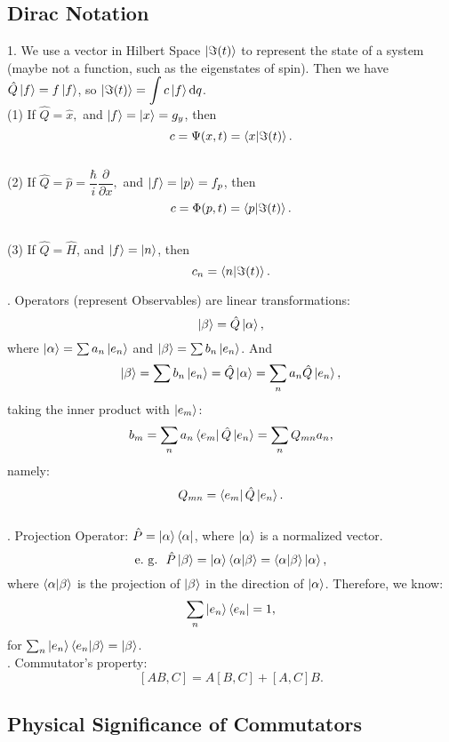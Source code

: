 \documentclass[12pt, 
]{article}
\begin{document}
\subsection{Dirac Notation}
1. We use a vector in Hilbert Space $\ket{\Im(t)}$ to represent the state of a system (maybe not a function, such as the eigenstates of spin). Then we have $\hat{Q}\ket{f}=f\ket{f}$, so $\ket{\Im(t)}=\displaystyle\int c\ket{f}{\rm d}q$.\\
(1) If $\hat{Q}=\hat{x},$ and $\ket{f}=\ket{x}=g_y$, then
\[
	c=\Psi(x,t)=\braket{x|\Im(t)}.
\]\\
(2) If $\hat{Q}=\hat{p}=\dfrac{\hbar}{i}\dfrac{\partial}{\partial x},$ and $\ket{f}=\ket{p}=f_p$, then
\[
	c=\Phi(p,t)=\braket{p|\Im(t)}.
\]\\
(3) If $\hat{Q}=\hat{H}$, and $\ket{f}=\ket{n}$, then
\[
	c_n=\braket{n|\Im(t)}.
\]

. Operators (represent Observables) are linear transformations:
\[
	\ket{\beta}=\hat{Q}\ket{\alpha},
\]
where $\ket{\alpha}=\sum a_n\ket{e_n}$ and $\ket{\beta}=\sum b_n\ket{e_n}$. And
\[
	\ket{\beta}=\sum b_n\ket{e_n}=\hat{Q}\ket{\alpha}=\sum_n a_n\hat{Q}\ket{e_n},
\]
taking the inner product with $\ket{e_m}$:
\[
	b_m=\sum_n a_n\bra{e_m}\hat{Q}\ket{e_n}=\sum_n Q_{mn} a_n,
\]
namely:
\begin{equation}\label{eq:16}
	Q_{mn}=\bra{e_m}\hat{Q}\ket{e_n}.
\end{equation}
~\\

. Projection Operator: $\hat{P}=\ket{\alpha}\bra{\alpha}$, where $\ket{\alpha}$ is a normalized vector.
\[
	{\rm e.~g.~}~\hat{P}\ket{\beta}=\ket{\alpha}\braket{\alpha|\beta}=\braket{\alpha|\beta}\ket{\alpha},
\]
where $\braket{\alpha|\beta}$ is the projection of $\ket{\beta}$ in the direction of $\ket{\alpha}$. Therefore, we know:
\[
	\sum_n \ket{e_n}\bra{e_n}=1,
\]
for $\sum_n \ket{e_n}\braket{e_n|\beta}=\ket{\beta}$.
~\\

. Commutator's property: 
\begin{equation}\label{eq:17}
	[AB,C]=A[B,C]+[A,C]B.
\end{equation}

\newpage

\subsection{Physical Significance of Commutators}
\end{document}
